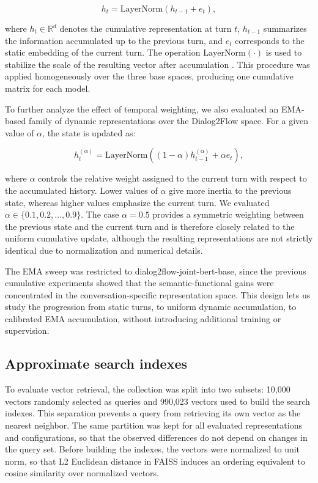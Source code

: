 \documentclass[runningheads]{llncs}
\begin{document}
\begin{equation}
    h_t = \mathrm{LayerNorm}(h_{t-1} + e_t),
\end{equation}

\noindent where $h_t \in \mathbb{R}^d$ denotes the cumulative representation at turn $t$, $h_{t-1}$ summarizes the information accumulated up to the previous turn, and $e_t$ corresponds to the static embedding of the current turn. The operation $\mathrm{LayerNorm}(\cdot)$ is used to stabilize the scale of the resulting vector after accumulation \cite{ba2016layer}. This procedure was applied homogeneously over the three base spaces, producing one cumulative matrix for each model.

To further analyze the effect of temporal weighting, we also evaluated an EMA-based family of dynamic representations over the Dialog2Flow space. For a given value of $\alpha$, the state is updated as:

\begin{equation}
    h_t^{(\alpha)} = \mathrm{LayerNorm}\left((1-\alpha)h_{t-1}^{(\alpha)} + \alpha e_t\right),
    \label{eq:ema}
\end{equation}

\noindent where $\alpha$ controls the relative weight assigned to the current turn with respect to the accumulated history. Lower values of $\alpha$ give more inertia to the previous state, whereas higher values emphasize the current turn. We evaluated $\alpha \in \{0.1, 0.2, \ldots, 0.9\}$. The case $\alpha=0.5$ provides a symmetric weighting between the previous state and the current turn and is therefore closely related to the uniform cumulative update, although the resulting representations are not strictly identical due to normalization and numerical details.

The EMA sweep was restricted to dialog2flow-joint-bert-base, since the previous cumulative experiments showed that the semantic-functional gains were concentrated in the conversation-specific representation space. This design lets us study the progression from static turns, to uniform dynamic accumulation, to calibrated EMA accumulation, without introducing additional training or supervision.

\subsection{Approximate search indexes}

To evaluate vector retrieval, the collection was split into two subsets: 10{,}000 vectors randomly selected as queries and 990{,}023 vectors used to build the search indexes. This separation prevents a query from retrieving its own vector as the nearest neighbor. The same partition was kept for all evaluated representations and configurations, so that the observed differences do not depend on changes in the query set. Before building the indexes, the vectors were normalized to unit norm, so that L2 Euclidean distance in FAISS induces an ordering equivalent to cosine similarity over normalized vectors.
\end{document}
